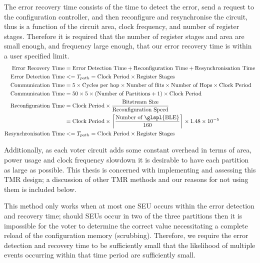 \documentclass[12pt,final,oneside]{dwThesis} %
\begin{document}
   The error recovery time consists of the time to detect the error, send a request to the configuration controller, and then reconfigure and resynchronise the circuit, thus is a function of the circuit area, clock frequency, and number of register stages. Therefore it is required that the number of register stages and area are small enough, and frequency large enough, that our error recovery time is within a user specified limit.
   \begin{align}
      \mbox{Error Recovery Time} &=\mbox{Error Detection Time} + \mbox{Reconfiguration Time} + \mbox{Resynchronisation Time}\notag\\
      \mbox{Error Detection Time} &<= T_{path} = \mbox{Clock Period}\times\mbox{Register Stages}\notag\\
      \mbox{Communication Time} &= 5\times \mbox{Cycles per hop}\times\mbox{Number of flits}\times\mbox{Number of Hops}\times \mbox{Clock Period}\notag\\
      \mbox{Communication Time} &= 50\times 5\times (\mbox{Number of Partitions}+1)\times \mbox{Clock Period}\notag\\
      \mbox{Reconfiguration Time} &= \mbox{Clock Period}\times \frac{\mbox{Bitstream Size}}{\mbox{Reconfiguration Speed}}\notag\\
      &= \mbox{Clock Period}\times \left\lceil \frac{\mbox{Number of \glspl{BLE}}}{160}\right\rceil\times 1.48\times10^{-5}\notag\\
      \mbox{Resynchronisation Time} &<= T_{path} = \mbox{Clock Period}\times\mbox{Register Stages}\notag\\
   \end{align}

   Additionally, as each voter circuit adds some constant overhead in terms of area, power usage and clock frequency slowdown it is desirable to have each partition as large as possible. This thesis is concerned with implementing and assessing this \gls{TMR} design; a discussion of other \gls{TMR} methods and our reasons for not using them is included below.

   This method only works when at most one \gls{SEU} occurs within the error detection and recovery time; should \glspl{SEU} occur in two of the three partitions then it is impossible for the voter to determine the correct value necessitating a complete reload of the configuration memory (\gls{scrubbing}). Therefore, we require the error detection and recovery time to be sufficiently small that the likelihood of multiple events occurring within that time period are sufficiently small.
\end{document}
